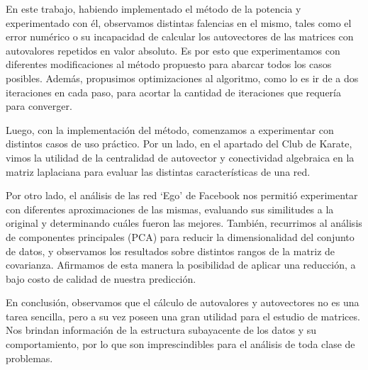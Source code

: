 \vspace{2em}

En este trabajo, habiendo implementado el método de la potencia y experimentado con él, observamos distintas falencias en el mismo, tales como el error numérico o su incapacidad de calcular los autovectores de las matrices con autovalores repetidos en valor absoluto. Es por esto que experimentamos con diferentes modificaciones al método propuesto para abarcar todos los casos posibles. Además, propusimos optimizaciones al algoritmo, como lo es ir de a dos iteraciones en cada paso, para acortar la cantidad de iteraciones que requería para converger. 

Luego, con la implementación del método, comenzamos a experimentar con distintos casos de uso práctico. Por un lado, en el apartado del Club de Karate, vimos la utilidad de la centralidad de autovector y conectividad algebraica en la matriz laplaciana para evaluar las distintas características de una red. 

Por otro lado, el análisis de las red `Ego' de Facebook nos permitió experimentar con diferentes aproximaciones de las mismas, evaluando sus similitudes a la original y determinando cuáles fueron las mejores. También, recurrimos al análisis de componentes principales (PCA) para reducir la dimensionalidad del conjunto de datos, y observamos los resultados sobre distintos rangos de la matriz de covarianza. Afirmamos de esta manera la posibilidad de aplicar una reducción, a bajo costo de calidad de nuestra predicción.

En conclusión, observamos que el cálculo de autovalores y autovectores no es una tarea sencilla, pero a su vez poseen una gran utilidad para el estudio de matrices. Nos brindan información de la estructura subayacente de los datos y su comportamiento, por lo que son imprescindibles para el análisis de toda clase de problemas.
